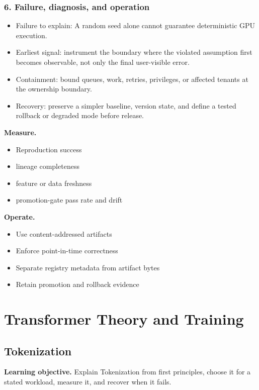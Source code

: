 \subsubsection*{6. Failure, diagnosis, and operation}
\begin{itemize}
\item Failure to explain: A random seed alone cannot guarantee deterministic GPU execution.
\item Earliest signal: instrument the boundary where the violated assumption first becomes observable, not only the final user-visible error.
\item Containment: bound queues, work, retries, privileges, or affected tenants at the ownership boundary.
\item Recovery: preserve a simpler baseline, version state, and define a tested rollback or degraded mode before release.
\end{itemize}
\textbf{Measure.}\begin{itemize}
\item Reproduction success
\item lineage completeness
\item feature or data freshness
\item promotion-gate pass rate and drift
\end{itemize}
\textbf{Operate.}\begin{itemize}
\item Use content-addressed artifacts
\item Enforce point-in-time correctness
\item Separate registry metadata from artifact bytes
\item Retain promotion and rollback evidence
\end{itemize}
\clearpage\section{Transformer Theory and Training}
\subsection{Tokenization}
\textbf{Learning objective.} Explain Tokenization from first principles, choose it for a stated workload, measure it, and recover when it fails.
